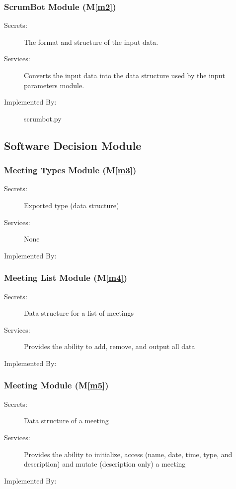 \documentclass[12pt, titlepage]{article}
\newcommand{\mref}[1]{M\ref{#1}}
\begin{document}
\subsubsection{ScrumBot Module (\mref{m2})}
\begin{description}
    \item[Secrets:] The format and structure of the input data.
    \item[Services:] Converts the input data into the data structure used by the input parameters module.
    \item[Implemented By:] scrumbot.py
\end{description}

\subsection{Software Decision Module}
\subsubsection{Meeting Types Module (\mref{m3})}
\begin{description}
    \item[Secrets:] Exported type (data structure)
    \item[Services:] None
    \item[Implemented By:] 
\end{description}

\subsubsection{Meeting List Module (\mref{m4})}
\begin{description}
    \item[Secrets:] Data structure for a list of meetings
    \item[Services:] Provides the ability to add, remove, and output all data
    \item[Implemented By:] 
\end{description}

\subsubsection{Meeting Module (\mref{m5})}
\begin{description}
    \item[Secrets:] Data structure of a meeting
    \item[Services:] Provides the ability to initialize, access (name, date, time, type, and description) and mutate (description only) a meeting
    \item[Implemented By:] 
\end{description}
\end{document}
